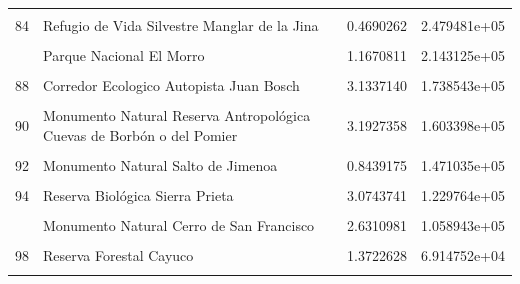\documentclass[10pt,landscape,a3paper]{article}
\begin{document}
\begin{longtable}[t]{llrr}
\cellcolor{lightgray}{83} & \cellcolor{lightgray}{Refugio de Vida Silvestre Lagunas Redonda y Limón} & \cellcolor{lightgray}{1.1499667} & \cellcolor{lightgray}{3.053692e+05}\\
84 & Refugio de Vida Silvestre Manglar de la Jina & 0.4690262 & 2.479481e+05\\
\cellcolor{lightgray}{85} & \cellcolor{lightgray}{Corredor Ecologico Autopista Duarte} & \cellcolor{lightgray}{2.0818581} & \cellcolor{lightgray}{2.158105e+05}\\
\addlinespace
86 & Parque Nacional El Morro & 1.1670811 & 2.143125e+05\\
\cellcolor{lightgray}{87} & \cellcolor{lightgray}{Refugio de Vida Silvestre Ría Maimón} & \cellcolor{lightgray}{4.2676421} & \cellcolor{lightgray}{2.060333e+05}\\
88 & Corredor Ecologico Autopista Juan Bosch & 3.1337140 & 1.738543e+05\\
\cellcolor{lightgray}{89} & \cellcolor{lightgray}{Monumento Natural Las Marías} & \cellcolor{lightgray}{3.8115492} & \cellcolor{lightgray}{1.716999e+05}\\
90 & Monumento Natural Reserva Antropológica Cuevas de Borbón o del Pomier & 3.1927358 & 1.603398e+05\\
\addlinespace
\cellcolor{lightgray}{91} & \cellcolor{lightgray}{Corredor Ecologico Autopista 6 de Noviembre} & \cellcolor{lightgray}{4.2652112} & \cellcolor{lightgray}{1.549519e+05}\\
92 & Monumento Natural Salto de Jimenoa & 0.8439175 & 1.471035e+05\\
\cellcolor{lightgray}{93} & \cellcolor{lightgray}{Monumento Natural Los Cacheos} & \cellcolor{lightgray}{0.2519722} & \cellcolor{lightgray}{1.405244e+05}\\
94 & Reserva Biológica Sierra Prieta & 3.0743741 & 1.229764e+05\\
\cellcolor{lightgray}{95} & \cellcolor{lightgray}{Reserva Forestal Cerro de Bocanigua} & \cellcolor{lightgray}{0.3878312} & \cellcolor{lightgray}{1.132792e+05}\\
\addlinespace
96 & Monumento Natural Cerro de San Francisco & 2.6310981 & 1.058943e+05\\
\cellcolor{lightgray}{97} & \cellcolor{lightgray}{Monumento Natural Las Dunas de las Calderas} & \cellcolor{lightgray}{0.4461092} & \cellcolor{lightgray}{7.797633e+04}\\
98 & Reserva Forestal Cayuco & 1.3722628 & 6.914752e+04\\
\cellcolor{lightgray}{99} & \cellcolor{lightgray}{Refugio de Vida Silvestre Manglares de Puerto Viejo} & \cellcolor{lightgray}{0.4427118} & \cellcolor{lightgray}{4.929034e+04}\\

\end{longtable}
\end{document}
